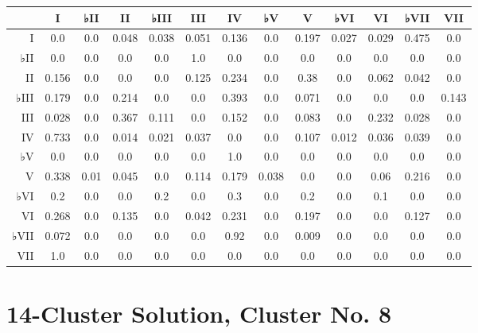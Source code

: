 \begin{table}[htbp]
\begin{minipage}{\linewidth}
\setlength{\tymax}{0.5\linewidth}
\centering
\small
\begin{tabulary}{\textwidth}{@{}RCCCCCCCCCCCC@{}} \toprule
&I&♭II&II&♭III&III&IV&♭V&V&♭VI&VI&♭VII&VII\\
\midrule
I&0.0&0.0&0.048&0.038&0.051&0.136&0.0&0.197&0.027&0.029&0.475&0.0\\
♭II&0.0&0.0&0.0&0.0&1.0&0.0&0.0&0.0&0.0&0.0&0.0&0.0\\
II&0.156&0.0&0.0&0.0&0.125&0.234&0.0&0.38&0.0&0.062&0.042&0.0\\
♭III&0.179&0.0&0.214&0.0&0.0&0.393&0.0&0.071&0.0&0.0&0.0&0.143\\
III&0.028&0.0&0.367&0.111&0.0&0.152&0.0&0.083&0.0&0.232&0.028&0.0\\
IV&0.733&0.0&0.014&0.021&0.037&0.0&0.0&0.107&0.012&0.036&0.039&0.0\\
♭V&0.0&0.0&0.0&0.0&0.0&1.0&0.0&0.0&0.0&0.0&0.0&0.0\\
V&0.338&0.01&0.045&0.0&0.114&0.179&0.038&0.0&0.0&0.06&0.216&0.0\\
♭VI&0.2&0.0&0.0&0.2&0.0&0.3&0.0&0.2&0.0&0.1&0.0&0.0\\
VI&0.268&0.0&0.135&0.0&0.042&0.231&0.0&0.197&0.0&0.0&0.127&0.0\\
♭VII&0.072&0.0&0.0&0.0&0.0&0.92&0.0&0.009&0.0&0.0&0.0&0.0\\
VII&1.0&0.0&0.0&0.0&0.0&0.0&0.0&0.0&0.0&0.0&0.0&0.0\\

\bottomrule

\end{tabulary}
\end{minipage}
\end{table}

\section{14-Cluster Solution, Cluster No. 8}
\label{14-clustersolutionclusterno.8}


